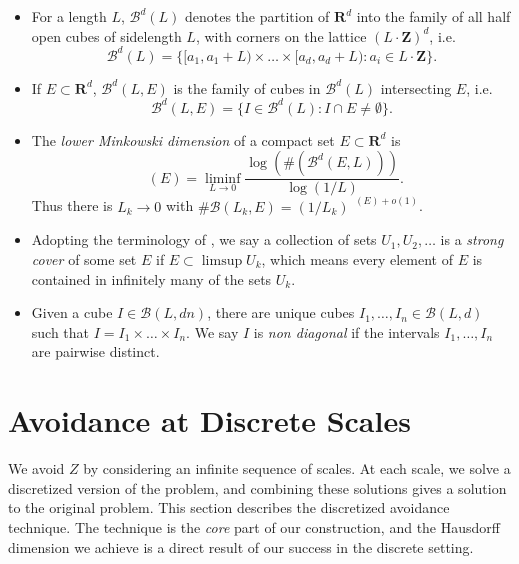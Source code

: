 \documentclass{article}
\theoremstyle{plain}
\theoremstyle{plain}
\DeclareMathOperator{\lhdim}{\underline{\dim}_{\mathbf{M}}}
\DeclareMathOperator{\lmbdim}{\underline{\dim}_{\mathbf{MB}}}
\begin{document}
\begin{itemize}
	\item For a length $L$, $\mathcal{B}^d(L)$ denotes the partition of $\mathbf{R}^d$ into the family of all half open cubes of sidelength $L$, with corners on the lattice $(L \cdot \mathbf{Z})^d$, i.e.
	\[ \mathcal{B}^d(L) = \{ [a_1,a_1 + L) \times \dots \times [a_d, a_d + L) : a_i \in L \cdot \mathbf{Z} \}. \]

	\item If $E \subset \mathbf{R}^d$, $\mathcal{B}^d(L,E)$ is the family of cubes in $\mathcal{B}^d(L)$ intersecting $E$, i.e.
	\[\mathcal{B}^d(L,E) = \{ I \in \mathcal{B}^d(L): I \cap E \neq \emptyset \}. \]

	\item The {\it lower Minkowski dimension} of a compact set $E \subset \mathbf{R}^d$ is
	\[ \lhdim(E) = \liminf_{L \to 0} \frac{\log( \#( \mathcal{B}^d(E,L) ) )}{\log(1/L)}. \]
	Thus there is $L_k \to 0$ with $\# \mathcal{B}(L_k,E) = (1/L_k)^{\lhdim(E) + o(1)}$.


	\item Adopting the terminology of \cite{KatzTao}, we say a collection of sets $U_1, U_2, \dots$ is a {\it strong cover} of some set $E$ if $E \subset \limsup U_k$, which means every element of $E$ is contained in infinitely many of the sets $U_k$.

	\item Given a cube $I \in \mathcal{B}(L, dn)$, there are unique cubes $I_1, \dots, I_n \in \mathcal{B}(L,d)$ such that $I = I_1 \times \dots \times I_n$. We say $I$ is {\it non diagonal} if the intervals $I_1, \dots, I_n$ are pairwise distinct.
\end{itemize}

\section{Avoidance at Discrete Scales}

We avoid $Z$ by considering an infinite sequence of scales. At each scale, we solve a discretized version of the problem, and combining these solutions gives a solution to the original problem. This section describes the discretized avoidance technique. The technique is the {\it core} part of our construction, and the Hausdorff dimension we achieve is a direct result of our success in the discrete setting.
\end{document}
